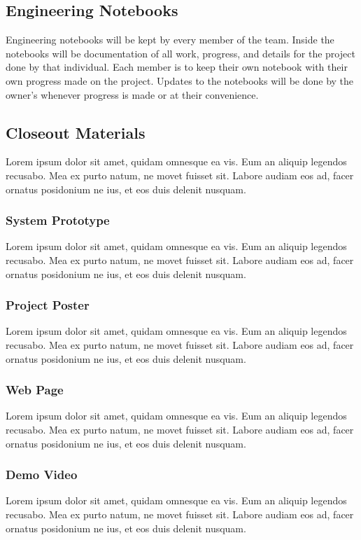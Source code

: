 \subsection{Engineering Notebooks}
Engineering notebooks will be kept by every member of the team. Inside the notebooks will be documentation of all work, progress, and details for the project done by that individual. Each member is to keep their own notebook with their own progress made on the project. Updates to the notebooks will be done by the owner’s whenever progress is made or at their convenience.   

\subsection{Closeout Materials}
Lorem ipsum dolor sit amet, quidam omnesque ea vis. Eum an aliquip legendos recusabo. Mea ex purto natum, ne movet fuisset sit. Labore audiam eos ad, facer ornatus posidonium ne ius, et eos duis delenit nusquam.

\subsubsection{System Prototype}
Lorem ipsum dolor sit amet, quidam omnesque ea vis. Eum an aliquip legendos recusabo. Mea ex purto natum, ne movet fuisset sit. Labore audiam eos ad, facer ornatus posidonium ne ius, et eos duis delenit nusquam.

\subsubsection{Project Poster}
Lorem ipsum dolor sit amet, quidam omnesque ea vis. Eum an aliquip legendos recusabo. Mea ex purto natum, ne movet fuisset sit. Labore audiam eos ad, facer ornatus posidonium ne ius, et eos duis delenit nusquam.

\subsubsection{Web Page}
Lorem ipsum dolor sit amet, quidam omnesque ea vis. Eum an aliquip legendos recusabo. Mea ex purto natum, ne movet fuisset sit. Labore audiam eos ad, facer ornatus posidonium ne ius, et eos duis delenit nusquam.

\subsubsection{Demo Video}
Lorem ipsum dolor sit amet, quidam omnesque ea vis. Eum an aliquip legendos recusabo. Mea ex purto natum, ne movet fuisset sit. Labore audiam eos ad, facer ornatus posidonium ne ius, et eos duis delenit nusquam.

